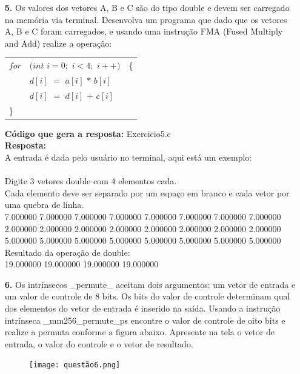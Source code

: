 \documentclass[oneside,a4paper,12pt]{article}
\renewcommand{\b}{\textbf}
\begin{document}
\begin{enumerate}
    \item[\b{5.}] Os valores dos vetores A, B e C são do tipo double e devem ser carregado na memória via terminal. Desenvolva um programa que dado que os vetores A, B e C foram carregados, e usando uma instrução FMA (Fused Multiply and Add) realize a operação:
    
    \begin{center}
    \begin{tabular}{cll}
    $for$ & $(int$ $i = 0;$ $i < 4;$ $i++)$ & \{ \\
          & $d[i]$ $=$ $a[i]$ $*$ $b[i]$ & \\
          & $d[i]$ $=$ $d[i]$ $+$ $c[i]$ & \\
    \multicolumn{1}{l}{\}} &  &
    \end{tabular}
    \end{center}
    
    \b{Código que gera a resposta:} Exercicio5.c\\
    \b{Resposta:}\\
    A entrada é dada pelo usuário no terminal, aqui está um exemplo:\\
    \\
    Digite 3 vetores double com 4 elementos cada.\\
    Cada elemento deve ser separado por um espaço em branco e cada vetor por uma quebra de linha.\\
    7.000000 7.000000 7.000000 7.000000 7.000000 7.000000 7.000000 7.000000\\
    2.000000 2.000000 2.000000 2.000000 2.000000 2.000000 2.000000 2.000000\\
    5.000000 5.000000 5.000000 5.000000 5.000000 5.000000 5.000000 5.000000\\
    Resultado da operação de double:\\
    19.000000 19.000000 19.000000 19.000000\\
    
   \item[\b{6.}] Os intrínsecos \_permute\_ aceitam dois argumentos: um vetor de entrada e um valor de controle de 8 bits. Os bits do valor de controle determinam qual dos elementos do vetor de entrada é inserido na saída. Usando a instrução intrínseca \_mm256\_permute\_ps encontre o valor de controle de oito bits e realize a permuta conforme a figura abaixo. Apresente na tela o vetor de entrada, o valor do controle e o vetor de resultado.
   
    \begin{figure}[H]
    \centering
    \texttt{[image: questão6.png]}
    \label{fig:Figura1}
    \end{figure}
   

\end{enumerate}
\end{document}
